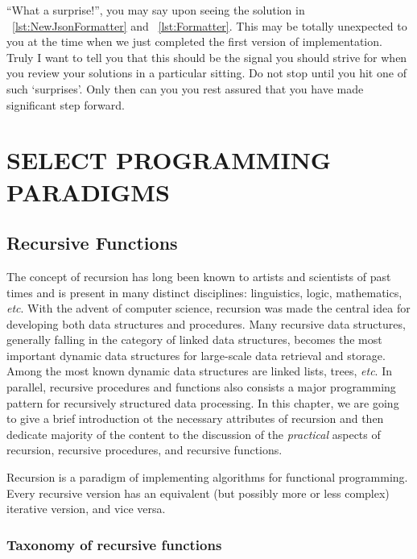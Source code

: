 \documentclass[oneside,11pt]{book}
\theoremstyle{definition}
\theoremstyle{remark}
\begin{document}
``What a surprise!'', you may say upon seeing the solution in ~\autoref{lst:NewJsonFormatter} and
~\autoref{lst:Formatter}.
This may be totally unexpected to you at the time when we just completed the first version of
implementation.
Truly I want to tell you that this should be the signal you should strive for when you review your
solutions in a particular sitting.
Do not stop until you hit one of such `surprises'.
Only then can you you rest assured that you have made significant step forward.
\clearpage{}

    \part{\uppercase{Select Programming Paradigms}}\label{prt:advancedTopic}

    \clearpage{}

\chapter{Recursive Functions} \label{ch:recursion}

The concept of recursion has long been known to artists and scientists of past times and is present
in many distinct disciplines: linguistics, logic, mathematics, \textit{etc}.
With the advent of computer science, recursion was made the central idea for developing
both data structures and procedures.
Many recursive data structures, generally falling in the category of linked data structures, becomes
the most important dynamic data structures for large-scale data retrieval and storage.
Among the most known dynamic data structures are linked lists, trees, \textit{etc}.
In parallel, recursive procedures and functions also consists a major programming pattern for
recursively structured data processing.
In this chapter, we are going to give a brief introduction ot the necessary attributes of
recursion and then dedicate majority of the content to the discussion of
the \emph{practical} aspects of recursion, recursive procedures, and recursive functions.

Recursion is a paradigm of implementing algorithms for functional programming.
Every recursive version has an equivalent (but possibly more or less complex) iterative version, and vice versa.

\section{Taxonomy of recursive functions}\label{sec:taxonomy-recursive-functions}
\end{document}
